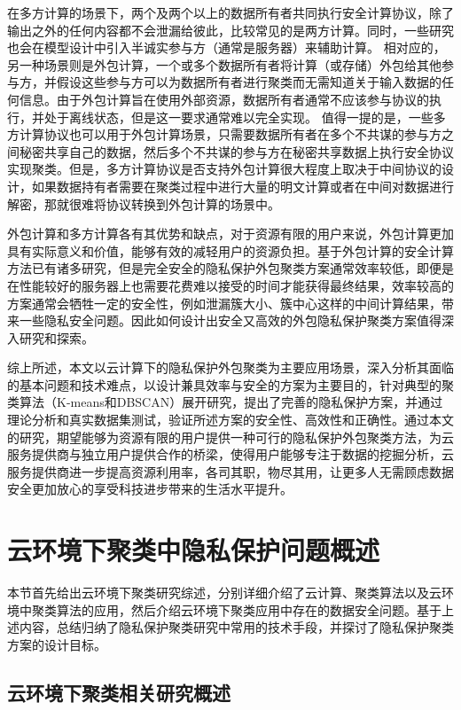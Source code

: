 在多方计算的场景下\cite{cramer2015secure}，两个及两个以上的数据所有者共同执行安全计算协议，除了输出之外的任何内容都不会泄漏给彼此，比较常见的是两方计算。同时，一些研究也会在模型设计中引入半诚实参与方（通常是服务器）来辅助计算。
相对应的，另一种场景则是外包计算\cite{li2018privacy}，一个或多个数据所有者将计算（或存储）外包给其他参与方，并假设这些参与方可以为数据所有者进行聚类而无需知道关于输入数据的任何信息。由于外包计算旨在使用外部资源，数据所有者通常不应该参与协议的执行，并处于离线状态，但是这一要求通常难以完全实现。
值得一提的是，一些多方计算协议也可以用于外包计算场景，只需要数据所有者在多个不共谋的参与方之间秘密共享自己的数据，然后多个不共谋的参与方在秘密共享数据上执行安全协议实现聚类。但是，多方计算协议是否支持外包计算很大程度上取决于中间协议的设计，如果数据持有者需要在聚类过程中进行大量的明文计算或者在中间对数据进行解密，那就很难将协议转换到外包计算的场景中。

外包计算和多方计算各有其优势和缺点，对于资源有限的用户来说，外包计算更加具有实际意义和价值，能够有效的减轻用户的资源负担。基于外包计算的安全计算方法已有诸多研究，但是完全安全的隐私保护外包聚类方案通常效率较低，即便是在性能较好的服务器上也需要花费难以接受的时间才能获得最终结果，效率较高的方案通常会牺牲一定的安全性，例如泄漏簇大小、簇中心这样的中间计算结果，带来一些隐私安全问题。因此如何设计出安全又高效的外包隐私保护聚类方案值得深入研究和探索。

综上所述，本文以云计算下的隐私保护外包聚类为主要应用场景，深入分析其面临的基本问题和技术难点，以设计兼具效率与安全的方案为主要目的，针对典型的聚类算法（K-means和DBSCAN）展开研究，提出了完善的隐私保护方案，并通过理论分析和真实数据集测试，验证所述方案的安全性、高效性和正确性。通过本文的研究，期望能够为资源有限的用户提供一种可行的隐私保护外包聚类方法，为云服务提供商与独立用户提供合作的桥梁，使得用户能够专注于数据的挖掘分析，云服务提供商进一步提高资源利用率，各司其职，物尽其用，让更多人无需顾虑数据安全更加放心的享受科技进步带来的生活水平提升。

\section{云环境下聚类中隐私保护问题概述}
本节首先给出云环境下聚类研究综述，分别详细介绍了云计算、聚类算法以及云环境中聚类算法的应用，然后介绍云环境下聚类应用中存在的数据安全问题。基于上述内容，总结归纳了隐私保护聚类研究中常用的技术手段，并探讨了隐私保护聚类方案的设计目标。
\subsection{云环境下聚类相关研究概述}
